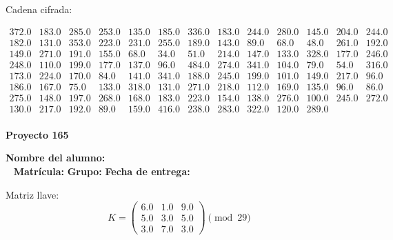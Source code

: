\documentclass[12pt]{article}
\begin{document}
Cadena cifrada:
\begin{center}
$\begin{array}{lllllllllllll}
372.0 & 183.0 & 285.0 & 253.0 & 135.0 & 185.0 & 336.0 & 183.0 & 244.0 & 280.0 & 145.0 & 204.0 & 244.0\\
182.0 & 131.0 & 353.0 & 223.0 & 231.0 & 255.0 & 189.0 & 143.0 & 89.0 & 68.0 & 48.0 & 261.0 & 192.0\\
149.0 & 271.0 & 191.0 & 155.0 & 68.0 & 34.0 & 51.0 & 214.0 & 147.0 & 133.0 & 328.0 & 177.0 & 246.0\\
248.0 & 110.0 & 199.0 & 177.0 & 137.0 & 96.0 & 484.0 & 274.0 & 341.0 & 104.0 & 79.0 & 54.0 & 316.0\\
173.0 & 224.0 & 170.0 & 84.0 & 141.0 & 341.0 & 188.0 & 245.0 & 199.0 & 101.0 & 149.0 & 217.0 & 96.0\\
186.0 & 167.0 & 75.0 & 133.0 & 318.0 & 131.0 & 271.0 & 218.0 & 112.0 & 169.0 & 135.0 & 96.0 & 86.0\\
275.0 & 148.0 & 197.0 & 268.0 & 168.0 & 183.0 & 223.0 & 154.0 & 138.0 & 276.0 & 100.0 & 245.0 & 272.0\\
130.0 & 217.0 & 192.0 & 89.0 & 159.0 & 416.0 & 238.0 & 283.0 & 322.0 & 120.0 & 289.0\\
\end{array}$
\end{center}

\newpage


\textbf{Proyecto 165}

\textbf{Nombre del alumno:} \underline{\hspace{13cm}}\\\
\vspace{1cm}
\textbf{Matrícula:} \underline{\hspace{4cm}} \hspace{1cm}
\textbf{Grupo:} \underline{\hspace{2cm}}
\textbf{Fecha de entrega:} \underline{\hspace{2cm}}

\medskip

Matriz llave:
\[
K = \begin{pmatrix}
6.0 & 1.0 & 9.0\\
5.0 & 3.0 & 5.0\\
3.0 & 7.0 & 3.0
\end{pmatrix} \pmod{29}
\]
\end{document}
